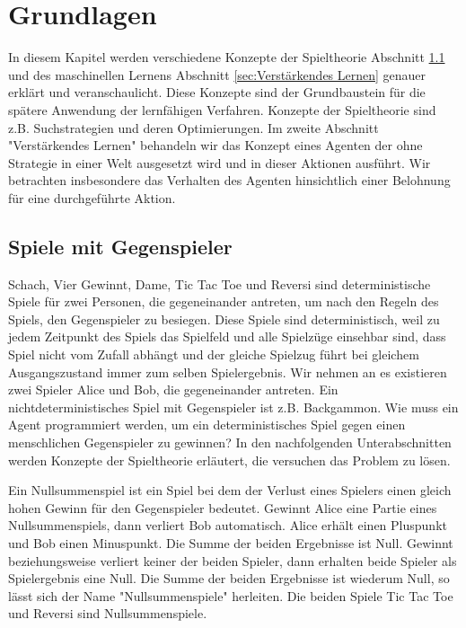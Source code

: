 \chapter{Grundlagen}
\label{cha:Grundlagen}

In diesem Kapitel werden verschiedene Konzepte der Spieltheorie Abschnitt \ref{sec:Spiele mit Gegner} und des maschinellen Lernens Abschnitt \ref{sec:Verstärkendes Lernen} genauer erklärt und veranschaulicht. Diese Konzepte sind der Grundbaustein für die spätere Anwendung der lernfähigen Verfahren. Konzepte der Spieltheorie sind z.B. Suchstrategien und deren Optimierungen. Im zweite Abschnitt "Verstärkendes Lernen" behandeln wir das Konzept eines Agenten der ohne Strategie in einer Welt ausgesetzt wird und in dieser Aktionen ausführt. Wir betrachten insbesondere das Verhalten des Agenten hinsichtlich einer Belohnung für eine durchgeführte Aktion. 

\section{Spiele mit Gegenspieler}
\label{sec:Spiele mit Gegner}
Schach, Vier Gewinnt, Dame, Tic Tac Toe und Reversi sind deterministische Spiele für zwei Personen, die gegeneinander antreten, um nach den Regeln des Spiels, den Gegenspieler zu besiegen. Diese Spiele sind deterministisch, weil zu jedem Zeitpunkt des Spiels das Spielfeld und alle Spielzüge einsehbar sind, dass Spiel nicht vom Zufall abhängt und der gleiche Spielzug führt bei gleichem Ausgangszustand immer zum selben Spielergebnis. Wir nehmen an es existieren zwei Spieler Alice und Bob, die gegeneinander antreten. Ein nichtdeterministisches Spiel mit Gegenspieler ist z.B. Backgammon. Wie muss ein Agent programmiert werden, um ein deterministisches Spiel gegen einen menschlichen Gegenspieler zu gewinnen? In den nachfolgenden Unterabschnitten werden Konzepte der Spieltheorie erläutert, die versuchen das Problem zu lösen.

Ein Nullsummenspiel ist ein Spiel bei dem der Verlust eines Spielers einen gleich hohen Gewinn für den Gegenspieler bedeutet. Gewinnt Alice eine Partie eines Nullsummenspiels, dann verliert Bob automatisch. Alice erhält einen Pluspunkt und Bob einen Minuspunkt. Die Summe der beiden Ergebnisse ist Null. Gewinnt beziehungsweise verliert keiner der beiden Spieler, dann erhalten beide Spieler als Spielergebnis eine Null. Die Summe der beiden Ergebnisse ist wiederum Null, so lässt sich der Name "Nullsummenspiele" herleiten. Die beiden Spiele Tic Tac Toe und Reversi sind Nullsummenspiele. 

